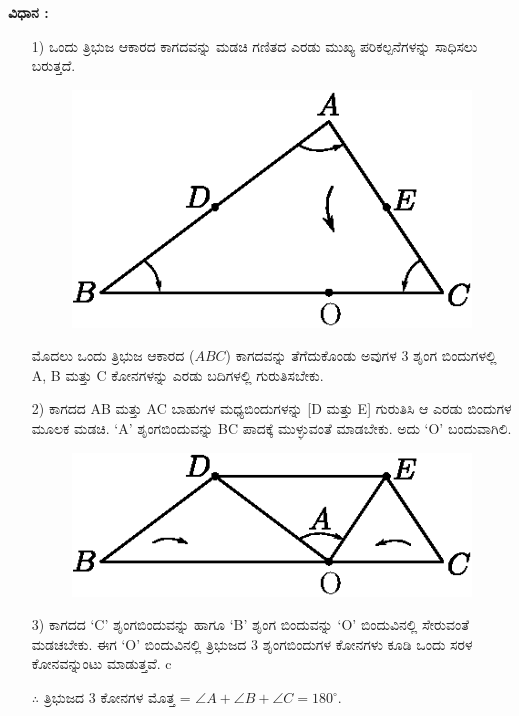 \medskip
\noindent
\textbf{ವಿಧಾನ :} 
\begin{itemize}
\item[1)]  ಒಂದು ತ್ರಿಭುಜ ಆಕಾರದ ಕಾಗದವನ್ನು ಮಡಚಿ ಗಣಿತದ ಎರಡು ಮುಖ್ಯ ಪರಿಕಲ್ಪನೆಗಳನ್ನು ಸಾಧಿಸಲು ಬರುತ್ತದೆ. 
  \begin{figure}[H]
\centering
\includegraphics[scale=.9]{src/figure/chap1/fig1-39a.eps}
\end{figure}
 
 ಮೊದಲು ಒಂದು ತ್ರಿಭುಜ ಆಕಾರದ ($ABC$) ಕಾಗದವನ್ನು ತೆಗೆದುಕೊಂಡು ಅವುಗಳ 3 ಶೃಂಗ ಬಿಂದುಗಳಲ್ಲಿ A, B ಮತ್ತು C ಕೋನಗಳನ್ನು ಎರಡು ಬದಿಗಳಲ್ಲಿ ಗುರುತಿಸಬೇಕು. 
  
\item[2)] ಕಾಗದದ AB ಮತ್ತು AC ಬಾಹುಗಳ ಮಧ್ಯಬಿಂದುಗಳನ್ನು [D ಮತ್ತು E] ಗುರುತಿಸಿ ಆ ಎರಡು ಬಿಂದುಗಳ ಮೂಲಕ ಮಡಚಿ. `A' ಶೃಂಗಬಿಂದುವನ್ನು BC ಪಾದಕ್ಕೆ ಮುಳ್ಳುವಂತೆ ಮಾಡಬೇಕು. ಅದು `O' ಬಂದುವಾಗಿಲಿ. 
\begin{figure}[H]
\centering
\includegraphics[scale=.9]{src/figure/chap1/fig1-39b.eps}
\end{figure}
 
\item[3)] ಕಾಗದದ `C' ಶೃಂಗಬಿಂದುವನ್ನು ಹಾಗೂ `B' ಶೃಂಗ ಬಿಂದುವನ್ನು  `O' ಬಿಂದುವಿನಲ್ಲಿ ಸೇರುವಂತೆ ಮಡಚಬೇಕು. ಈಗ  `O' ಬಿಂದುವಿನಲ್ಲಿ ತ್ರಿಭುಜದ 3  ಶೃಂಗಬಿಂದುಗಳ ಕೋನಗಳು ಕೂಡಿ ಒಂದು ಸರಳ ಕೋನವನ್ನುಂಟು ಮಾಡುತ್ತವೆ. 
c
 
$\therefore $ ತ್ರಿಭುಜದ 3  ಕೋನಗಳ ಮೊತ್ತ  = $\angle A + \angle  B + \angle C = 180^\circ$.


\end{itemize}
